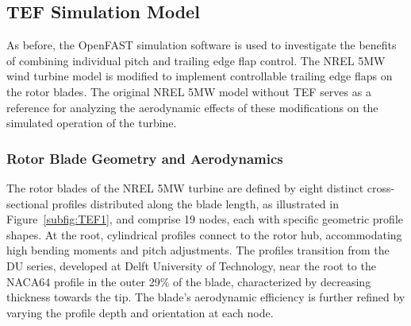 \subsection{TEF Simulation Model} %
As before, the OpenFAST simulation software is used to investigate the benefits of combining individual pitch and trailing edge flap control. The NREL 5MW wind turbine model is modified to implement controllable trailing edge flaps on the rotor blades. The original NREL 5MW model without TEF serves as a reference for analyzing the aerodynamic effects of these modifications on the simulated operation of the turbine. 
\subsubsection*{Rotor Blade Geometry and Aerodynamics}
The rotor blades of the NREL 5MW turbine are defined by eight distinct cross-sectional profiles distributed along the blade length, as illustrated in Figure~\ref{subfig:TEF1}, and comprise 19 nodes, each with specific geometric profile shapes. At the root, cylindrical profiles connect to the rotor hub, accommodating high bending moments and pitch adjustments. The profiles transition from the DU series, developed at Delft University of Technology, near the root to the NACA64 profile in the outer 29\% of the blade, characterized by decreasing thickness towards the tip. The blade's aerodynamic efficiency is further refined by varying the profile depth and orientation at each node.

